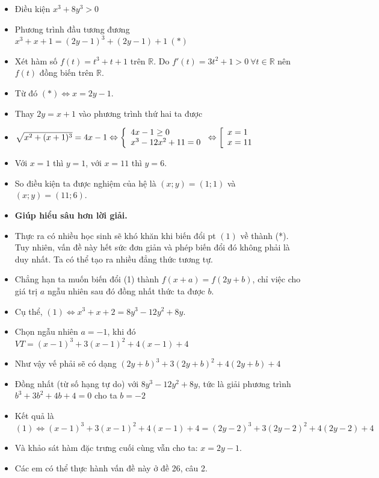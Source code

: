 \lgi 
\begin{itemize}[label=,leftmargin=*]
\item Điều kiện $x^3+8y^3>0$
\item Phương trình đầu tương đương $x^3+x+1=(2y-1)^3+(2y-1)+1 \ (*)$
\item Xét hàm số $f(t)=t^3+t+1$ trên $\mathbb{R}$. Do $f'(t)=3t^2+1>0 \ \forall t\in \mathbb{R}$ nên $f(t)$ đồng biến trên $\mathbb{R}$.
\item Từ đó $(*)\Leftrightarrow x=2y-1$.
\item Thay $2y=x+1$ vào phương trình thứ hai ta được
\item $\sqrt{x^2+(x+1)^3}=4x-1\Leftrightarrow \left\{\begin{array}{ll}4x-1 \ge 0 \\ x^3-12x^2+11=0\end{array}\right.\Leftrightarrow \left[\begin{array}{ll}x=1 \\ x=11\end{array}\right.$
\item Với $x=1$ thì $y=1$, với $x=11$ thì $y=6$.
\item So điều kiện ta được nghiệm của hệ là $(x;y)=(1;1)$ và $(x;y)=(11;6)$.
\item \textbf{Giúp hiểu sâu hơn lời giải.} 
\item Thực ra có nhiều học sinh sẽ khó khăn khi biến đổi pt $(1)$ về thành (*). Tuy nhiên, vấn đề này hết sức đơn giản và phép biến đổi đó không phải là duy nhất. Ta có thể tạo ra nhiều đẳng thức tương tự.
\item Chẳng hạn ta muốn biến đổi (1) thành $f(x+a)=f(2y+b)$, chỉ việc cho giá trị $a$ ngẫu nhiên sau đó đồng nhất thức ta được $b$.
\item Cụ thể, $(1)\Leftrightarrow x^3+x+2=8y^3-12y^2+8y$.
\item Chọn ngẫu nhiên $a=-1$, khi đó $VT=(x-1)^3+3(x-1)^2+4(x-1)+4$
\item Như vậy vế phải sẽ có dạng $(2y+b)^3+3(2y+b)^2+4(2y+b)+4$
\item Đồng nhất (từ số hạng tự do) với $8y^3-12y^2+8y$, tức là giải phương trình $b^3+3b^2+4b+4=0$ cho ta $b=-2$
\item Kết quả là $(1)\Leftrightarrow (x-1)^3+3(x-1)^2+4(x-1)+4=(2y-2)^3+3(2y-2)^2+4(2y-2)+4$
\item Và khảo sát hàm đặc trưng cuối cùng vẫn cho ta: $x=2y-1$.
\item Các em có thể thực hành vấn đề này ở đề 26, câu 2.
\end{itemize}

